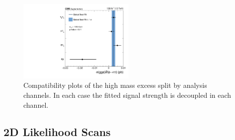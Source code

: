\begin{figure}[!hbtp]
\centering
    \includegraphics[width=0.5\textwidth]{Figures/ccc_fit_result_mH1200_per-channel.pdf}
\caption{Compatibility plots of the high mass excess split by analysis channels. In each case the fitted signal strength is decoupled in each channel.}
\label{fig:high_mass_compatibility}
\end{figure}

\subsection{2D Likelihood Scans}

